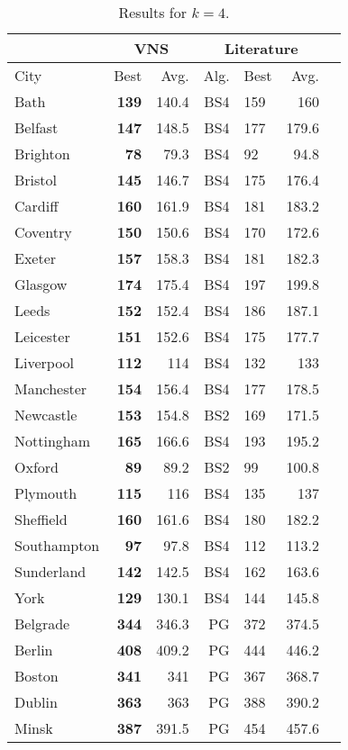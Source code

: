 \documentclass[dvipsnames,format=sigconf,anonymous=true,review=true]{acmart}
\begin{document}
\begin{table}
	\caption{Results for $k=4$.}
	\label{tab:k4}  
	\begin{tabular}{l|rr|rlrr}
		\hline
		\multicolumn{1}{c}{ } & \multicolumn{2}{|c}{VNS} & \multicolumn{3}{|c}{Literature} \\
		\hline
		City & Best & Avg. & Alg. & Best & Avg. \\ \hline
		Bath&\bf{139}&140.4&BS4&159&160\\
		Belfast&\bf{147}&148.5&BS4&177&179.6\\
		Brighton&\bf{78}&79.3&BS4&92&94.8\\
		Bristol&\bf{145}&146.7&BS4&175&176.4\\
		Cardiff&\bf{160}&161.9&BS4&181&183.2\\
		Coventry&\bf{150}&150.6&BS4&170&172.6\\
		Exeter&\bf{157}&158.3&BS4&181&182.3\\
		Glasgow&\bf{174}&175.4&BS4&197&199.8\\
		Leeds&\bf{152}&152.4&BS4&186&187.1\\
		Leicester&\bf{151}&152.6&BS4&175&177.7\\
		Liverpool&\bf{112}&114&BS4&132&133\\
		Manchester&\bf{154}&156.4&BS4&177&178.5\\
		Newcastle&\bf{153}&154.8&BS2&169&171.5\\
		Nottingham&\bf{165}&166.6&BS4&193&195.2\\
		Oxford&\bf{89}&89.2&BS2&99&100.8\\
		Plymouth&\bf{115}&116&BS4&135&137\\
		Sheffield&\bf{160}&161.6&BS4&180&182.2\\
		Southampton&\bf{97}&97.8&BS4&112&113.2\\
		Sunderland&\bf{142}&142.5&BS4&162&163.6\\
		York&\bf{129}&130.1&BS4&144&145.8\\ \hline \hline
		Belgrade&\bf{344}&346.3&PG&372&374.5\\
		Berlin&\bf{408}&409.2&PG&444&446.2\\
		Boston&\bf{341}&341&PG&367&368.7\\
		Dublin&\bf{363}&363&PG&388&390.2\\
		Minsk&\bf{387}&391.5&PG&454&457.6\\
		\hline

		
	\end{tabular}
\end{table}
\end{document}
